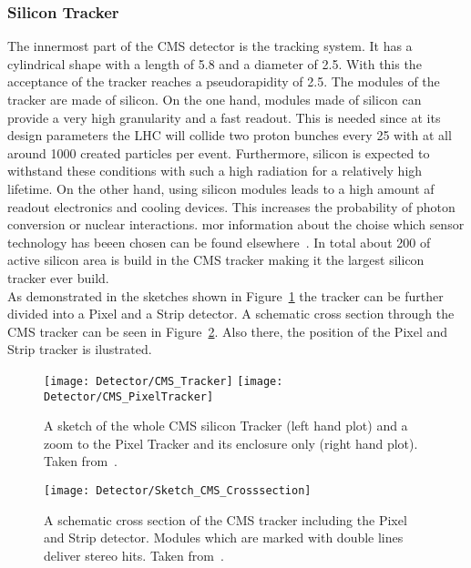 \subsubsection{Silicon Tracker}

The innermost part of the CMS detector is the tracking system. It has a cylindrical shape with a length of 5.8\m{} and a diameter of 2.5\m{}. With this the acceptance of the tracker reaches a pseudorapidity of 2.5. The modules of the tracker are made of silicon. On the one hand, modules made of silicon can provide a very high granularity and a fast readout. This is needed since at its design parameters the LHC will collide two proton bunches every 25\ns{} with at all around 1000 created particles per event. Furthermore, silicon is expected to withstand these conditions with such a high radiation for a relatively high lifetime. On the other hand, using silicon modules leads to a high amount af readout electronics and cooling devices. This increases the probability of photon conversion or nuclear interactions. mor information about the choise which sensor technology has beeen chosen can be found elsewhere~\cite{Chatrchyan:1129810}. In total about 200\ms{} of active silicon area is build in the CMS tracker making it the largest silicon tracker ever build.\\
As demonstrated in the sketches shown in Figure~\ref{plot:LHCCMSTrackerCMS} the tracker can be further divided into a Pixel and a Strip detector. A schematic cross section through the CMS tracker can be seen in Figure~\ref{plot:LHCCMSTrackerCrossCMS}. Also there, the position of the Pixel and Strip tracker is ilustrated.

\begin{figure}[!Hhtb]
    \centering
    \texttt{[image: Detector/CMS\_Tracker]}
    \texttt{[image: Detector/CMS\_PixelTracker]}
    \caption[Sketches of the CMS Tracker]{A sketch of the whole CMS silicon Tracker (left hand plot) and a zoom to the Pixel Tracker and its enclosure only (right hand plot). Taken from~. \label{plot:LHCCMSTrackerCMS}}
\end{figure}

\begin{figure}[!Hhtb]
    \centering
    \texttt{[image: Detector/Sketch\_CMS\_Crosssection]}
    \caption[Schematic cross section of the CMS Tracker]{A schematic cross section of the CMS tracker including the Pixel and Strip detector. Modules which are marked with double lines deliver stereo hits. Taken from~. \label{plot:LHCCMSTrackerCrossCMS}}
\end{figure}

